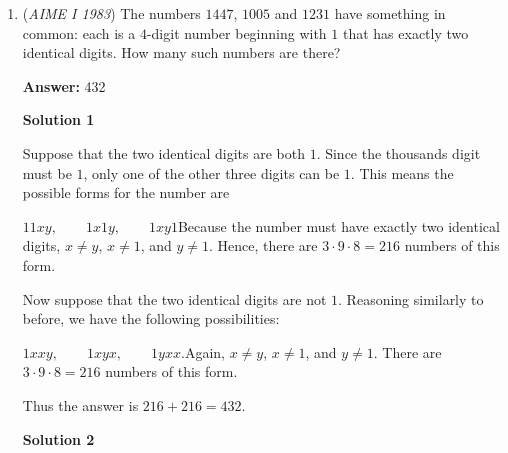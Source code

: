 \begin{enumerate}
 
-awesomediabrine

 



\textbf{Solution 6}

Seeing that we need to minimize, we think inequalities, and seeing squares, we think \href{https://artofproblemsolving.com/wiki/index.php?title=RMS-AM-GM-HM}{RMS-AM-GM-HM}. From this inequality, we know that $\sqrt{\frac{(3x\sin x)^2+2^2}{2}} \geq \sqrt{(3x\sin x)(2)}$, with equality holding when $3x\sin x=2$. From this inequality, we can see the following:\begin{align*}\sqrt{\frac{(3x\sin x)^2+2^2}{2}} \geq \sqrt{(3x\sin x)(2)} \\\frac{9x^2\sin^2x+4}{2} \geq 6x\sin x \\\frac{9x^2\sin^2x+4}{x\sin x} \geq 12\end{align*}
We can prove that the equality condition is possible as in Solution $1$. Thus, our answer is $\boxed{012}$.

 


	\item (\textit{AIME I 1983}) The numbers $1447$, $1005$ and $1231$ have something in common: each is a $4$-digit number beginning with $1$ that has exactly two identical digits. How many such numbers are there?


 
 \textbf{Answer: }432



\textbf{Solution 1}

Suppose that the two identical digits are both $1$. Since the thousands digit must be $1$, only one of the other three digits can be $1$. This means the possible forms for the number are

 $11xy,\qquad 1x1y,\qquad1xy1$Because the number must have exactly two identical digits, $x\neq y$, $x\neq1$, and $y\neq1$. Hence, there are $3\cdot9\cdot8=216$ numbers of this form.

 Now suppose that the two identical digits are not $1$. Reasoning similarly to before, we have the following possibilities:

 $1xxy,\qquad1xyx,\qquad1yxx.$Again, $x\neq y$, $x\neq 1$, and $y\neq 1$. There are $3\cdot9\cdot8=216$ numbers of this form.

 Thus the answer is $216+216=\boxed{432}$.

 



\textbf{Solution 2}


\end{enumerate}
